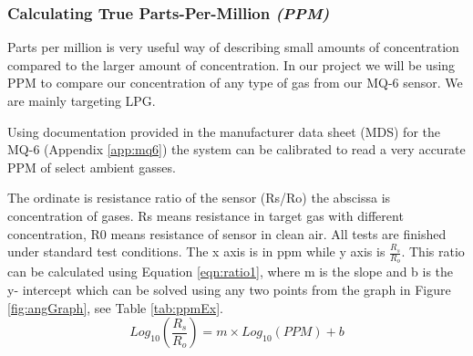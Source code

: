 			\subsubsection{Calculating True Parts-Per-Million \textit{(PPM)}}
				\par Parts per million is very useful way of describing small amounts of concentration compared to the larger amount of concentration. In our project we will be using PPM to compare our concentration of any type of gas from our MQ-6 sensor. We are mainly targeting LPG.
				\par Using documentation provided in the manufacturer data sheet (MDS) for the MQ-6 (Appendix \ref{app:mq6}) the system can be calibrated to read a very accurate PPM of select ambient gasses.
				\par The ordinate is resistance ratio of the sensor (Rs/Ro)  the abscissa is concentration of gases. Rs means resistance in target gas with different concentration, R0 means resistance of sensor in clean air. All tests are finished under standard test conditions. The x axis is in ppm while y axis is $\frac{R_s}{R_o}$. This ratio can be calculated using Equation \ref{eqn:ratio1}, where m is the slope and b is the y- intercept which can be solved using any two points from the graph in Figure \ref{fig:angGraph}, see Table \ref{tab:ppmEx}. \\
				\begin{equation}
				Log_10(\frac{R_s}{R_o}) = m\times Log_10(PPM) + b
				\label{eqn:ratio1}
				\end{equation}
				
